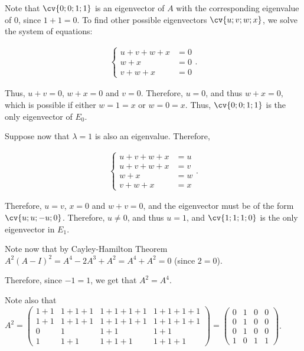 \documentclass[11pt]{scrartcl}
\begin{document}
\begin{soln}
  Note that $\cv{0;0;1;1}$ is an eigenvector of $A$ with the
  corresponding eigenvalue of $0$, since $1+1 = 0$. To find other
  possible eigenvectors $\cv{u;v;w;x}$, we solve the system of
  equations:
  
  \begin{align}
    \begin{cases}
      u+v+w+x & = 0 \\
      w+x     & = 0 \\
      v+w+x   & = 0
    \end{cases}.
  \end{align}

  Thus, $u+v = 0$, $w+x=0$ and $v = 0$. Therefore, $u=0$, and thus
  $w+x = 0$, which is possible if either $w=1=x$ or $w=0=x$. Thus,
  $\cv{0;0;1;1}$ is the only eigenvector of $E_0$.
  
  Suppose now that $\lambda = 1$ is also an eigenvalue. Therefore, 
  
  \begin{align}
    \begin{cases}
      u+v+w+x & = u \\
      u+v+w+x & = v \\
      w+x     & = w \\
      v+w+x   & = x
    \end{cases}.
  \end{align}

  Therefore, $u=v$, $x=0$ and $w+v = 0$, and the eigenvector must be
  of the form $\cv{u;u;-u;0}$. Therefore, $u \neq 0$, and thus $u=1$,
  and $\cv{1;1;1;0}$ is the only eigenvector in $E_{1}$.

  Note now that by Cayley-Hamilton Theorem
  $A^2(A-I)^2=A^4-2A^3+A^{2} = A^4+A^2=0$ (since $2=0$). 

  Therefore, since $-1 = 1$, we get that $A^2=A^4$.

  Note also that $A^2 =
  \begin{pmatrix}
    1+1 & 1+1+1 & 1+1+1+1   & 1+1+1+1 \\
    1+1 & 1+1+1 & 1+1+1+1   & 1+1+1+1 \\
    0   & 1     & 1+1       & 1+1     \\
    1   & 1+1   & 1 + 1 + 1 & 1 + 1 + 1
  \end{pmatrix} = 
  \begin{pmatrix}
    0 & 1 & 0 & 0\\
    0 & 1 & 0 & 0\\
    0 & 1 & 0 & 0\\
    1 & 0 & 1 & 1
  \end{pmatrix}
  $.


\end{soln}
\end{document}
